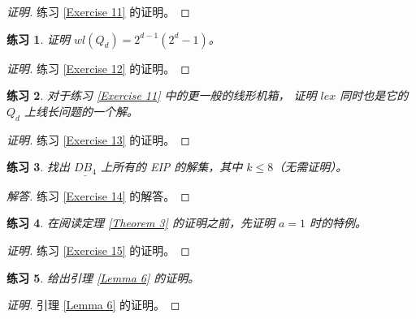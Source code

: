 \documentclass[12pt, a4paper]{article}
\newtheorem{exercisewithanswer}{练习}
\newenvironment{answer}[1][Answer]{
	\begin{proof}[#1]
	\let\qed\relax
}{
	\end{proof}
}
\begin{document}
\begin{proof}[证明]
练习 \ref{Exercise 11} 的证明。
\end{proof}

\begin{exercisewithanswer}
证明 $wl(Q_d) = 2^{d - 1} (2^d - 1)$。
\end{exercisewithanswer}

\begin{proof}[证明]
练习 \ref{Exercise 12} 的证明。
\end{proof}

\begin{exercisewithanswer}
对于练习 \ref{Exercise 11} 中的更一般的线形机箱，
证明 $lex$ 同时也是它的 $Q_d$ 上线长问题的一个解。
\end{exercisewithanswer}

\begin{proof}[证明]
练习 \ref{Exercise 13} 的证明。
\end{proof}

\begin{exercisewithanswer}
找出 $\underline{DB_4}$ 上所有的 EIP 的解集，其中 $k \le 8$（无需证明）。
\end{exercisewithanswer}

\begin{answer}[解答]
练习 \ref{Exercise 14} 的解答。
\end{answer}

\begin{exercisewithanswer}
在阅读定理 \ref{Theorem 3} 的证明之前，先证明 $a = 1$ 时的特例。
\end{exercisewithanswer}

\begin{proof}[证明]
练习 \ref{Exercise 15} 的证明。
\end{proof}

\begin{exercisewithanswer}
给出引理 \ref{Lemma 6} 的证明。
\end{exercisewithanswer}

\begin{proof}[证明]
引理 \ref{Lemma 6} 的证明。
\end{proof}
\end{document}
